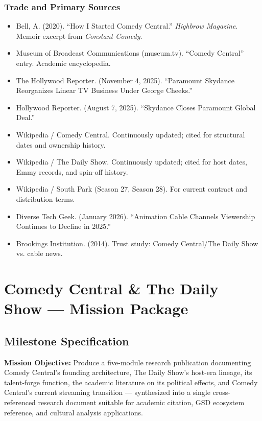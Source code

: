 \documentclass[11pt,letterpaper]{article}
\newcommand{\stageheader}[2]{%
  \noindent\colorbox{#2}{\makebox[\textwidth][l]{%
    \textcolor{white}{\bfseries\sffamily\hspace{6pt}#1\hspace{6pt}}}}%
  \vspace{0.5em}\par%
}
\begin{document}
\subsubsection{Trade and Primary Sources}

\begin{itemize}[leftmargin=*]
  \item Bell, A. (2020). ``How I Started Comedy Central.'' \textit{Highbrow Magazine}. Memoir excerpt from \textit{Constant Comedy}.
  \item Museum of Broadcast Communications (museum.tv). ``Comedy Central'' entry. Academic encyclopedia.
  \item The Hollywood Reporter. (November 4, 2025). ``Paramount Skydance Reorganizes Linear TV Business Under George Cheeks.''
  \item Hollywood Reporter. (August 7, 2025). ``Skydance Closes Paramount Global Deal.''
  \item Wikipedia / Comedy Central. Continuously updated; cited for structural dates and ownership history.
  \item Wikipedia / The Daily Show. Continuously updated; cited for host dates, Emmy records, and spin-off history.
  \item Wikipedia / South Park (Season 27, Season 28). For current contract and distribution terms.
  \item Diverse Tech Geek. (January 2026). ``Animation Cable Channels Viewership Continues to Decline in 2025.''
  \item Brookings Institution. (2014). Trust study: Comedy Central/The Daily Show vs. cable news.
\end{itemize}

\newpage
\stageheader{STAGE 3 --- MISSION PACKAGE}{tertiary}

\section{Comedy Central \& The Daily Show --- Mission Package}

\subsection{Milestone Specification}

\textbf{Mission Objective:} Produce a five-module research publication documenting Comedy Central's founding architecture, The Daily Show's host-era lineage, its talent-forge function, the academic literature on its political effects, and Comedy Central's current streaming transition --- synthesized into a single cross-referenced research document suitable for academic citation, GSD ecosystem reference, and cultural analysis applications.
\end{document}
